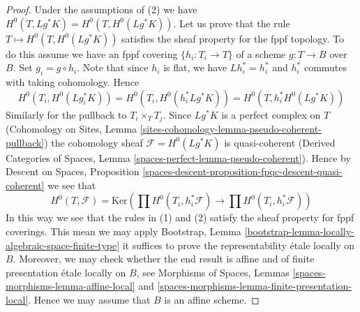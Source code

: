 \begin{proof}
Under the assumptions of (2) we have $H^0(T, Lg^*K) = H^0(T, H^0(Lg^*K))$.
Let us prove that the rule $T \mapsto H^0(T, H^0(Lg^*K))$ satisfies the
sheaf property for the fppf topology. To do this assume we have an
fppf covering $\{h_i : T_i \to T\}$ of a scheme $g : T \to B$ over $B$.
Set $g_i = g \circ h_i$. Note that since $h_i$ is flat, we have
$Lh_i^* = h_i^*$ and $h_i^*$ commutes with taking cohomology. Hence
$$
H^0(T_i, H^0(Lg_i^*K)) =
H^0(T_i, H^0(h_i^*Lg^*K)) =
H^0(T, h_i^*H^0(Lg^*K))
$$
Similarly for the pullback to $T_i \times_T T_j$.
Since $Lg^*K$ is a perfect complex on $T$
(Cohomology on Sites, Lemma
\ref{sites-cohomology-lemma-pseudo-coherent-pullback})
the cohomology sheaf $\mathcal{F} = H^0(Lg^*K)$ is quasi-coherent
(Derived Categories of Spaces, Lemma
\ref{spaces-perfect-lemma-pseudo-coherent}).
Hence by Descent on Spaces, Proposition
\ref{spaces-descent-proposition-fpqc-descent-quasi-coherent}
we see that
$$
H^0(T, \mathcal{F}) = \text{Ker}(
\prod H^0(T_i, h_i^*\mathcal{F}) \to
\prod H^0(T_i, h_i^*\mathcal{F}))
$$
In this way we see that the rules in (1) and (2) satisfy
the sheaf property for fppf coverings. This mean we may apply
Bootstrap, Lemma \ref{bootstrap-lemma-locally-algebraic-space-finite-type}
it suffices to prove the representability \'etale locally on $B$. Moreover,
we may check whether the end result is affine and of finite presentation
\'etale locally on $B$, see
Morphisms of Spaces, Lemmas \ref{spaces-morphisms-lemma-affine-local} and
\ref{spaces-morphisms-lemma-finite-presentation-local}.
Hence we may assume that $B$ is an affine scheme.


\end{proof}
